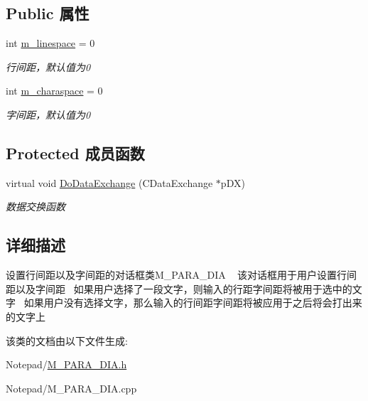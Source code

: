 \subsection*{Public 属性}
\begin{DoxyCompactItemize}
\item 
\mbox{\label{class_m___p_a_r_a___d_i_a_aea31fe9cfbcfd5a9c9d218a0f5a821f7}} 
int \hyperlink{class_m___p_a_r_a___d_i_a_aea31fe9cfbcfd5a9c9d218a0f5a821f7}{m\+\_\+linespace} = 0
\begin{DoxyCompactList}\small\item\em 行间距，默认值为0 \end{DoxyCompactList}\item 
\mbox{\label{class_m___p_a_r_a___d_i_a_abdddacb23484b11c4ddf7be621fecd74}} 
int \hyperlink{class_m___p_a_r_a___d_i_a_abdddacb23484b11c4ddf7be621fecd74}{m\+\_\+charaspace} = 0
\begin{DoxyCompactList}\small\item\em 字间距，默认值为0 \end{DoxyCompactList}\end{DoxyCompactItemize}
\subsection*{Protected 成员函数}
\begin{DoxyCompactItemize}
\item 
\mbox{\label{class_m___p_a_r_a___d_i_a_a7d7ff9f843610a3ddccd12da36df7751}} 
virtual void \hyperlink{class_m___p_a_r_a___d_i_a_a7d7ff9f843610a3ddccd12da36df7751}{Do\+Data\+Exchange} (C\+Data\+Exchange $\ast$p\+DX)
\begin{DoxyCompactList}\small\item\em 数据交换函数 \end{DoxyCompactList}\end{DoxyCompactItemize}


\subsection{详细描述}
设置行间距以及字间距的对话框类\+M\+\_\+\+P\+A\+R\+A\+\_\+\+D\+IA ~\newline
该对话框用于用户设置行间距以及字间距~\newline
如果用户选择了一段文字，则输入的行距字间距将被用于选中的文字~\newline
如果用户没有选择文字，那么输入的行间距字间距将被应用于之后将会打出来的文字上~\newline


该类的文档由以下文件生成\+:\begin{DoxyCompactItemize}
\item 
Notepad/\hyperlink{_m___p_a_r_a___d_i_a_8h}{M\+\_\+\+P\+A\+R\+A\+\_\+\+D\+I\+A.\+h}\item 
Notepad/M\+\_\+\+P\+A\+R\+A\+\_\+\+D\+I\+A.\+cpp\end{DoxyCompactItemize}
